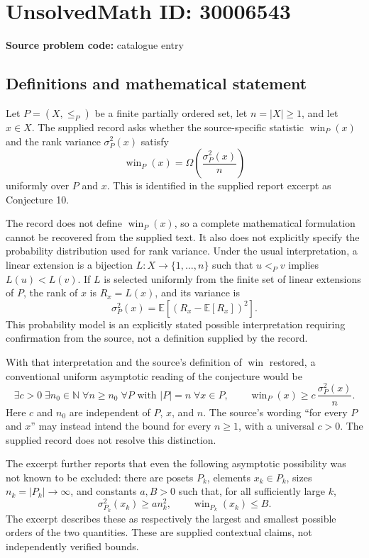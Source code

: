\documentclass[11pt]{article}
\newcommand{\N}{\mathbb{N}}
\begin{document}
\section*{UnsolvedMath ID: 30006543}
\textbf{Source problem code:} catalogue entry
\subsection{Definitions and mathematical statement}
Let \(P=(X,\leq_P)\) be a finite partially ordered set, let \(n=|X|\geq 1\), and let \(x\in X\). The supplied record asks whether the source-specific statistic \(\operatorname{win}_P(x)\) and the rank variance \(\sigma_P^2(x)\) satisfy
\[
\operatorname{win}_P(x)=\Omega\!\left(\frac{\sigma_P^2(x)}{n}\right)
\]
uniformly over \(P\) and \(x\). This is identified in the supplied report excerpt as Conjecture 10.

The record does not define \(\operatorname{win}_P(x)\), so a complete mathematical formulation cannot be recovered from the supplied text. It also does not explicitly specify the probability distribution used for rank variance. Under the usual interpretation, a linear extension is a bijection \(L:X\to\{1,\ldots,n\}\) such that \(u<_P v\) implies \(L(u)<L(v)\). If \(L\) is selected uniformly from the finite set of linear extensions of \(P\), the rank of \(x\) is \(R_x=L(x)\), and its variance is
\[
\sigma_P^2(x)=\mathbb{E}\!\left[\left(R_x-\mathbb{E}[R_x]\right)^2\right].
\]
This probability model is an explicitly stated possible interpretation requiring confirmation from the source, not a definition supplied by the record.

With that interpretation and the source's definition of \(\operatorname{win}\) restored, a conventional uniform asymptotic reading of the conjecture would be
\[
\exists c>0\;\exists n_0\in\N\;\forall n\geq n_0\;
\forall P\text{ with }|P|=n\;\forall x\in P,
\qquad
\operatorname{win}_P(x)\geq c\,\frac{\sigma_P^2(x)}{n}.
\]
Here \(c\) and \(n_0\) are independent of \(P\), \(x\), and \(n\). The source's wording ``for every \(P\) and \(x\)'' may instead intend the bound for every \(n\geq1\), with a universal \(c>0\). The supplied record does not resolve this distinction.

The excerpt further reports that even the following asymptotic possibility was not known to be excluded: there are posets \(P_k\), elements \(x_k\in P_k\), sizes \(n_k=|P_k|\to\infty\), and constants \(a,B>0\) such that, for all sufficiently large \(k\),
\[
\sigma_{P_k}^2(x_k)\geq a n_k^2,
\qquad
\operatorname{win}_{P_k}(x_k)\leq B.
\]
The excerpt describes these as respectively the largest and smallest possible orders of the two quantities. These are supplied contextual claims, not independently verified bounds.
\end{document}
